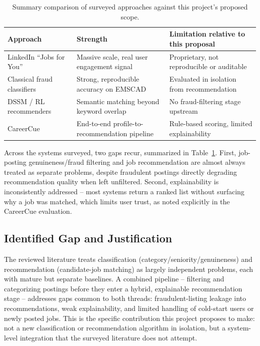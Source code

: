 \documentclass[11pt,a4paper]{article}
\begin{document}
\begin{table}[h]
\centering
\small
\begin{tabular}{@{}p{3.6cm}p{5.6cm}p{5.4cm}@{}}
\toprule
\textbf{Approach} & \textbf{Strength} & \textbf{Limitation relative to this proposal} \\
\midrule
LinkedIn ``Jobs for You'' & Massive scale, real user engagement signal & Proprietary,
not reproducible or auditable \\
Classical fraud classifiers~\cite{nasser2020,ijraset2021} & Strong, reproducible
accuracy on EMSCAD & Evaluated in isolation from recommendation \\
DSSM / RL recommenders~\cite{mishra2022,drl} & Semantic matching beyond keyword overlap
& No fraud-filtering stage upstream \\
CareerCue~\cite{careercue} & End-to-end profile-to-recommendation pipeline & Rule-based
scoring, limited explainability \\
\bottomrule
\end{tabular}
\caption{Summary comparison of surveyed approaches against this project's proposed scope.}
\label{tab:lit-comparison}
\end{table}

Across the systems surveyed, two gaps recur, summarized in Table~\ref{tab:lit-comparison}.
First, job-posting genuineness/fraud filtering and job recommendation are almost always
treated as separate problems, despite fraudulent postings directly degrading
recommendation quality when left unfiltered. Second, explainability is inconsistently
addressed -- most systems return a ranked list without surfacing why a job was matched,
which limits user trust, as noted explicitly in the CareerCue evaluation.

\subsection{Identified Gap and Justification}
\label{sec:gap}

The reviewed literature treats classification (category/seniority/genuineness) and
recommendation (candidate-job matching) as largely independent problems, each with
mature but separate baselines. A combined pipeline -- filtering and categorizing
postings before they enter a hybrid, explainable recommendation stage -- addresses gaps
common to both threads: fraudulent-listing leakage into recommendations, weak
explainability, and limited handling of cold-start users or newly posted jobs. This is
the specific contribution this project proposes to make: not a new classification or
recommendation algorithm in isolation, but a system-level integration that the surveyed
literature does not attempt.
\end{document}

